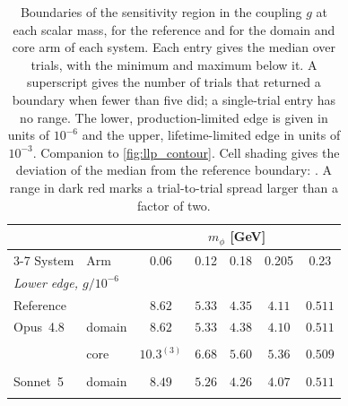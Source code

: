 \clearpage
\begin{table}[H]
\centering
\small
\setlength{\tabcolsep}{4pt}
\caption{Boundaries of the sensitivity region in the coupling $g$ at each scalar mass, for the reference and for the domain and core arm of each system. Each entry gives the median over trials, with the minimum and maximum below it. A superscript gives the number of trials that returned a boundary when fewer than five did; a single-trial entry has no range. The lower, production-limited edge is given in units of $10^{-6}$ and the upper, lifetime-limited edge in units of $10^{-3}$. Companion to \cref{fig:llp_contour}. Cell shading gives the deviation of the median from the reference boundary: \protect\llpkey. A range in dark red marks a trial-to-trial spread larger than a factor of two.}
\label{tab:llp_contour}
\begin{tabular}{ll*{5}{c}}
\toprule
& & \multicolumn{5}{c}{$m_\phi$ [GeV]} \\
\cmidrule(lr){3-7}
System & Arm & 0.06 & 0.12 & 0.18 & 0.205 & 0.23 \\
\midrule
\multicolumn{7}{l}{\textit{Lower edge, $g/10^{-6}$}} \\
\midrule
\multicolumn{2}{l}{Reference} & $8.62$ & $5.33$ & $4.35$ & $4.11$ & $0.511$ \\[2pt]
Opus~4.8 & domain & \cellcolor{llpA}$8.62$ & \cellcolor{llpA}$5.33$ & \cellcolor{llpA}$4.38$ & \cellcolor{llpA}$4.10$ & \cellcolor{llpA}$0.511$ \\
 &  & \cellcolor{llpA}{\scriptsize$[8.57,\,10.6]$} & \cellcolor{llpA}{\scriptsize$[5.31,\,7.02]$} & \cellcolor{llpA}{\scriptsize$[4.33,\,5.92]$} & \cellcolor{llpA}{\scriptsize$[4.09,\,5.66]$} & \cellcolor{llpA}{\scriptsize$[0.510,\,0.512]$} \\[2pt]
 & core & \cellcolor{llpC}$10.3^{(3)}$ & \cellcolor{llpC}$6.68$ & \cellcolor{llpC}$5.60$ & \cellcolor{llpC}$5.36$ & \cellcolor{llpA}$0.509$ \\
 &  & \cellcolor{llpC}{\color{llpSpread}{\scriptsize$[5.41,\,11.7]$}} & \cellcolor{llpC}{\color{llpSpread}{\scriptsize$[3.55,\,7.58]$}} & \cellcolor{llpC}{\color{llpSpread}{\scriptsize$[2.98,\,6.47]$}} & \cellcolor{llpC}{\color{llpSpread}{\scriptsize$[2.85,\,6.08]$}} & \cellcolor{llpA}{\color{llpSpread}{\scriptsize$[0.235,\,0.598]$}} \\[2pt]
Sonnet~5 & domain & \cellcolor{llpA}$8.49$ & \cellcolor{llpA}$5.26$ & \cellcolor{llpA}$4.26$ & \cellcolor{llpA}$4.07$ & \cellcolor{llpA}$0.511$ \\
 &  & \cellcolor{llpA}{\scriptsize$[7.55,\,8.59]$} & \cellcolor{llpA}{\scriptsize$[5.03,\,5.35]$} & \cellcolor{llpA}{\scriptsize$[3.74,\,4.35]$} & \cellcolor{llpA}{\scriptsize$[3.55,\,4.09]$} & \cellcolor{llpA}{\scriptsize$[0.485,\,0.511]$} \\[2pt]

\end{tabular}
\end{table}
